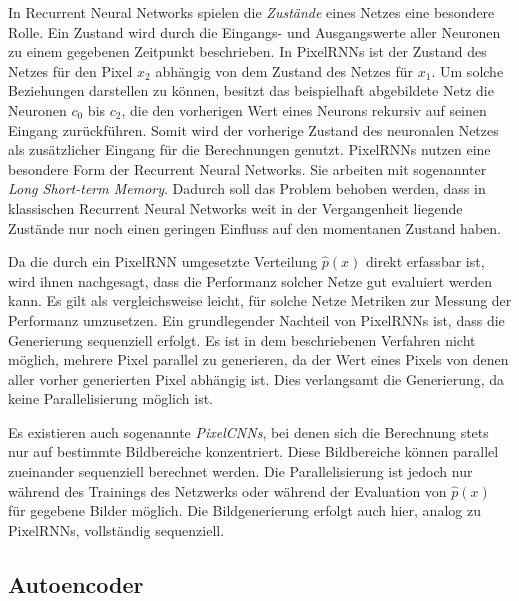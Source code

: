 In Recurrent Neural Networks spielen die \emph{Zustände} eines Netzes eine besondere Rolle. Ein Zustand wird durch die Eingangs- und Ausgangswerte aller Neuronen zu einem gegebenen Zeitpunkt beschrieben. In \acp{PixelRNN} ist der Zustand des Netzes für den Pixel $x_{2}$ abhängig von dem Zustand des Netzes für $x_{1}$. Um solche Beziehungen darstellen zu können, besitzt das beispielhaft abgebildete Netz die Neuronen $c_{0}$ bis $c_{2}$, die den vorherigen Wert eines Neurons rekursiv auf seinen Eingang zurückführen. Somit wird der vorherige Zustand des neuronalen Netzes als zusätzlicher Eingang für die Berechnungen genutzt. \acp{PixelRNN} nutzen eine besondere Form der Recurrent Neural Networks. Sie arbeiten mit sogenannter \emph{Long Short-term Memory}. Dadurch soll das Problem behoben werden, dass in klassischen Recurrent Neural Networks weit in der Vergangenheit liegende Zustände nur noch einen geringen Einfluss auf den momentanen Zustand haben. \cite{generativeModelsSurvey}

Da die durch ein \ac{PixelRNN} umgesetzte Verteilung $\hat{p}(x)$ direkt erfassbar ist, wird ihnen nachgesagt, dass die Performanz solcher Netze gut evaluiert werden kann. Es gilt als vergleichsweise leicht, für solche Netze Metriken zur Messung der Performanz umzusetzen. Ein grundlegender Nachteil von \acp{PixelRNN} ist, dass die Generierung sequenziell erfolgt. Es ist in dem beschriebenen Verfahren nicht möglich, mehrere Pixel parallel zu generieren, da der Wert eines Pixels von denen aller vorher generierten Pixel abhängig ist. Dies verlangsamt die Generierung, da keine Parallelisierung möglich ist. \cite{generativeModelsSurvey}

Es existieren auch sogenannte \emph{PixelCNNs}, bei denen sich die Berechnung stets nur auf bestimmte Bildbereiche konzentriert. Diese Bildbereiche können parallel zueinander sequenziell berechnet werden. Die Parallelisierung ist jedoch nur während des Trainings des Netzwerks oder während der Evaluation von $\hat{p}(x)$ für gegebene Bilder möglich. Die Bildgenerierung erfolgt auch hier, analog zu \acp{PixelRNN}, vollständig sequenziell. \cite{pixelRNN}

\subsection{Autoencoder}


